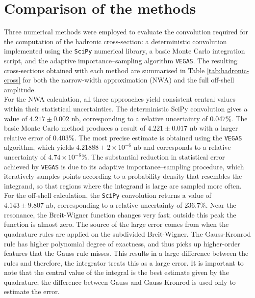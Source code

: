 \documentclass[a4paper,11pt]{article}
\begin{document}
\section{Comparison of the methods}\label{sec8}
Three numerical methods were employed to evaluate the convolution required for the computation of the hadronic cross-section: a deterministic convolution implemented using the \texttt{SciPy} numerical library, a basic Monte Carlo integration script, and the adaptive importance–sampling algorithm \texttt{VEGAS}. The resulting cross-sections obtained with each method are summarised in Table \ref{tab:hadronic-cross} for both the narrow-width approximation (NWA) and the full off-shell amplitude.\\

For the NWA calculation, all three approaches yield consistent central values within their statistical uncertainties. The deterministic SciPy convolution gives a value of $4.217 \pm 0.002$ nb, corresponding to a relative uncertainty of 0.047\%. The basic Monte Carlo method produces a result of 
$4.221 \pm 0.017$ nb with a larger relative error of 0.403\%. The most precise estimate is obtained using the \texttt{VEGAS} algorithm, which yields  $4.21888 \pm 2\times10^{-6}$ nb and corresponds to a relative uncertainty of $4.74 \times 10^{-6}$\%. The substantial reduction in statistical error achieved by \texttt{VEGAS} is due to its adaptive importance–sampling procedure, which iteratively samples points according to a probability density that resembles the integrand, so that regions where the integrand is large are sampled more often.\\

For the off-shell calculation, the \texttt{SciPy} convolution returns a value of $4.143 \pm 9.807$ nb, corresponding to a relative uncertainty of $236.7\%$. Near the resonance, the Breit-Wigner function changes very fast; outside this peak the function is almost zero. The source of the large error comes from when the quadrature rules are applied on the subdivided Breit-Wigner. The Gauss-Kronrod rule has higher polynomial degree of exactness, and thus picks up higher-order features that the Gauss rule misses. This results in a large difference between the rules and therefore, the integrator treats this as a large error. It is important to note that the central value of the integral is the best estimate given by the quadrature; the difference between Gauss and Gauss-Kronrod is used only to estimate the error.\\
\end{document}
